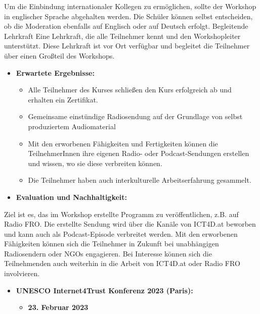 Um die Einbindung internationaler Kollegen zu ermöglichen, sollte der Workshop in englischer Sprache abgehalten werden. Die Schüler können selbst entscheiden, ob die Moderation ebenfalls auf Englisch oder auf Deutsch erfolgt.
Begleitende Lehrkraft
Eine Lehrkraft, die alle Teilnehmer kennt und den Workshopleiter unterstützt. Diese Lehrkraft ist vor Ort verfügbar und begleitet die Teilnehmer über einen Großteil des Workshops.

\begin{itemize}
    \item \textbf{Erwartete Ergebnisse:}
          \begin{itemize}
              \item {Alle Teilnehmer des Kurses schließen den Kurs erfolgreich ab und erhalten ein Zertifikat.}
              \item {Gemeinsame einstündige Radiosendung auf der Grundlage von selbst produziertem Audiomaterial}
              \item {Mit den erworbenen Fähigkeiten und Fertigkeiten können die TeilnehmerInnen ihre eigenen Radio- oder Podcast-Sendungen erstellen und wissen, wo sie diese verbreiten können.}
              \item {Die Teilnehmer haben auch interkulturelle Arbeitserfahrung gesammelt.}
          \end{itemize}
\end{itemize}

\begin{itemize}
    \item \textbf{Evaluation und Nachhaltigkeit:}
\end{itemize}

Ziel ist es, das im Workshop erstellte Programm zu veröffentlichen, z.B. auf Radio FRO. Die erstellte Sendung wird über die Kanäle von ICT4D.at beworben und kann auch als Podcast-Episode verbreitet werden. Mit den erworbenen Fähigkeiten können sich die Teilnehmer in Zukunft bei unabhängigen Radiosendern oder NGOs engagieren. Bei Interesse können sich die Teilnehmenden auch weiterhin in die Arbeit von ICT4D.at oder Radio FRO involvieren.

\begin{itemize}
    \item \textbf{UNESCO Internet4Trust Konferenz 2023 (Paris):}
          \begin{itemize}
              \item \textbf{23. Februar 2023}
          \end{itemize}
\end{itemize}

